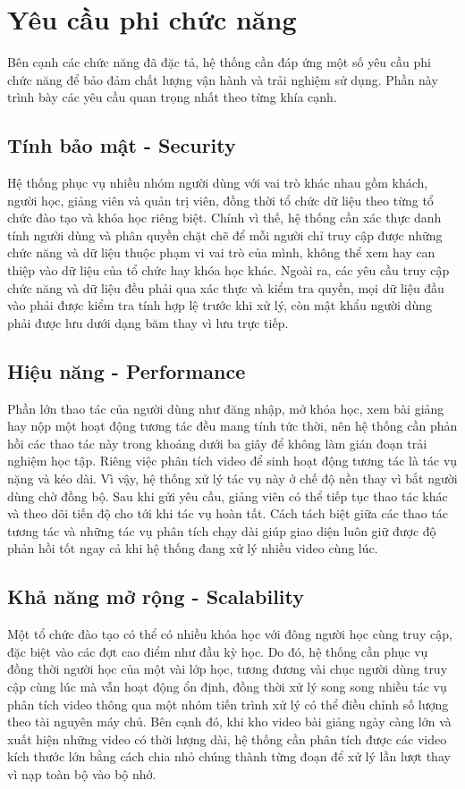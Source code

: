 \documentclass[../DoAn.tex]{subfiles}
\begin{document}
\section{Yêu cầu phi chức năng}
\label{section:2.4}
Bên cạnh các chức năng đã đặc tả, hệ thống cần đáp ứng một số yêu cầu phi chức năng để bảo đảm chất lượng vận hành và trải nghiệm sử dụng. Phần này trình bày các yêu cầu quan trọng nhất theo từng khía cạnh.

\subsection{Tính bảo mật - Security}
Hệ thống phục vụ nhiều nhóm người dùng với vai trò khác nhau gồm khách, người học, giảng viên và quản trị viên, đồng thời tổ chức dữ liệu theo từng tổ chức đào tạo và khóa học riêng biệt. Chính vì thế, hệ thống cần xác thực danh tính người dùng và phân quyền chặt chẽ để mỗi người chỉ truy cập được những chức năng và dữ liệu thuộc phạm vi vai trò của mình, không thể xem hay can thiệp vào dữ liệu của tổ chức hay khóa học khác. Ngoài ra, các yêu cầu truy cập chức năng và dữ liệu đều phải qua xác thực và kiểm tra quyền, mọi dữ liệu đầu vào phải được kiểm tra tính hợp lệ trước khi xử lý, còn mật khẩu người dùng phải được lưu dưới dạng băm thay vì lưu trực tiếp.

\subsection{Hiệu năng - Performance}
Phần lớn thao tác của người dùng như đăng nhập, mở khóa học, xem bài giảng hay nộp một hoạt động tương tác đều mang tính tức thời, nên hệ thống cần phản hồi các thao tác này trong khoảng dưới ba giây để không làm gián đoạn trải nghiệm học tập. Riêng việc phân tích video để sinh hoạt động tương tác là tác vụ nặng và kéo dài. Vì vậy, hệ thống xử lý tác vụ này ở chế độ nền thay vì bắt người dùng chờ đồng bộ. Sau khi gửi yêu cầu, giảng viên có thể tiếp tục thao tác khác và theo dõi tiến độ cho tới khi tác vụ hoàn tất. Cách tách biệt giữa các thao tác tương tác và những tác vụ phân tích chạy dài giúp giao diện luôn giữ được độ phản hồi tốt ngay cả khi hệ thống đang xử lý nhiều video cùng lúc.

\subsection{Khả năng mở rộng - Scalability}
Một tổ chức đào tạo có thể có nhiều khóa học với đông người học cùng truy cập, đặc biệt vào các đợt cao điểm như đầu kỳ học. Do đó, hệ thống cần phục vụ đồng thời người học của một vài lớp học, tương đương vài chục người dùng truy cập cùng lúc mà vẫn hoạt động ổn định, đồng thời xử lý song song nhiều tác vụ phân tích video thông qua một nhóm tiến trình xử lý có thể điều chỉnh số lượng theo tài nguyên máy chủ. Bên cạnh đó, khi kho video bài giảng ngày càng lớn và xuất hiện những video có thời lượng dài, hệ thống cần phân tích được các video kích thước lớn bằng cách chia nhỏ chúng thành từng đoạn để xử lý lần lượt thay vì nạp toàn bộ vào bộ nhớ.
\end{document}
